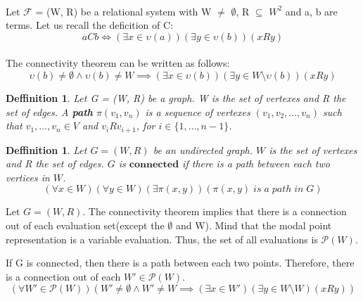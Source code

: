 \documentclass{article}
\newcommand\F{\mathcal{F}}
\newcommand\p{\mathcal{P}}
\newtheorem{defn}[theorem]{Deffinition}
\begin{document}
	\paragraph{} Let $\F$ = (W, R) be a relational system with W $\neq$ $\emptyset$, R $\subseteq$ $W^2$ and a, b are terms. Let us recall the deficition of C:
	\begin{equation}
		aCb \iff (\exists x \in \upsilon(a)) (\exists y \in \upsilon(b))(xRy)
	\end{equation}

	\paragraph{} The connectivity theorem can be written as follows:
	\begin{equation}
		\upsilon(b) \neq \emptyset \land \upsilon(b) \neq W \implies (\exists x \in \upsilon(b)) (\exists y \in W \setminus \upsilon(b))(xRy)
	\end{equation}

	\begin{defn}
		Let G = (W, R) be a graph. W is the set of vertexes and R the set of edges. A \textbf{path} $\pi(v_1, v_n)$ is a sequence of vertexes $(v_1, v_2, \dotsc , v_n)$ such that $v_1,\dotsc,v_n \in V$ and $v_iRv_{i+1}$, for $i \in \{1,\dotsc,n-1\}$.
	\end{defn}

	\begin{defn}
		Let $G = (W, R)$ be an undirected graph. $W$ is the set of vertexes and R the set of edges. $G$ is $\mathbf{connected}$ if there is a path between each two vertices in $W$.
		\begin{equation}
			(\forall x \in W)(\forall y \in W)(\exists \pi(x, y)) (\pi(x, y)\;is\;a\;path\;in\;G)
		\end{equation}
	\end{defn}

	Let $G = (W, R)$. The connectivity theorem implies that there is a connection out of each evaluation set(except the $\emptyset$ and W). Mind that the modal point representation is a variable evaluation. Thus, the set of all evaluations is  $\p(W)$.

	If G is connected, then there is a path between each two points. Therefore, there is a connection out of each $W' \in \p(W)$.
		\begin{equation}
			(\forall W' \in \p(W))(W' \neq \emptyset \land W' \neq W \implies(\exists x \in W')(\exists y \in W \setminus W)(xRy))
		\end{equation}
\end{document}
